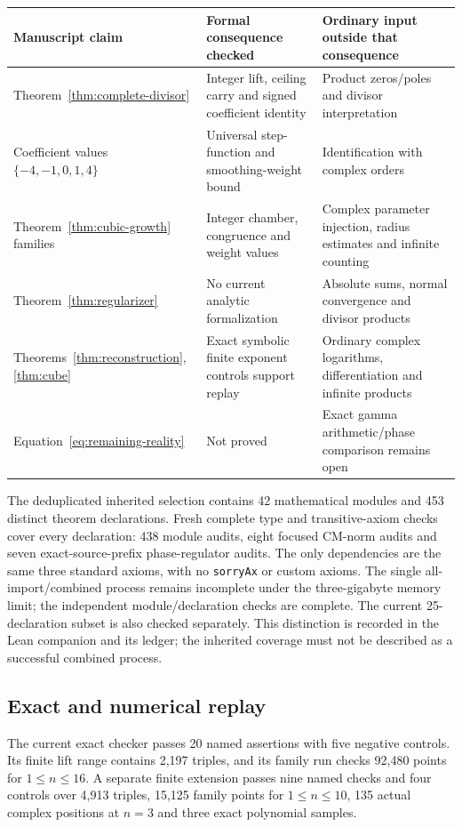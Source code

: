 \begin{longtable}{p{.28\linewidth}p{.29\linewidth}p{.35\linewidth}}
\toprule Manuscript claim & Formal consequence checked & Ordinary input outside that consequence\\\midrule\endhead
Theorem~\ref{thm:complete-divisor} & Integer lift, ceiling carry and signed coefficient identity & Product zeros/poles and divisor interpretation\\
Coefficient values $\{-4,-1,0,1,4\}$ & Universal step-function and smoothing-weight bound & Identification with complex orders\\
Theorem~\ref{thm:cubic-growth} families & Integer chamber, congruence and weight values & Complex parameter injection, radius estimates and infinite counting\\
Theorem~\ref{thm:regularizer} & No current analytic formalization & Absolute sums, normal convergence and divisor products\\
Theorems~\ref{thm:reconstruction}, \ref{thm:cube} & Exact symbolic finite exponent controls support replay & Ordinary complex logarithms, differentiation and infinite products\\
Equation~\eqref{eq:remaining-reality} & Not proved & Exact gamma arithmetic/phase comparison remains open\\\bottomrule
\end{longtable}
The deduplicated inherited selection contains 42 mathematical modules and 453 distinct theorem declarations. Fresh complete type and transitive-axiom checks cover every declaration: 438 module audits, eight focused CM-norm audits and seven exact-source-prefix phase-regulator audits. The only dependencies are the same three standard axioms, with no \texttt{sorryAx} or custom axioms. The single all-import/combined process remains incomplete under the three-gigabyte memory limit; the independent module/declaration checks are complete. The current 25-declaration subset is also checked separately. This distinction is recorded in the Lean companion and its ledger; the inherited coverage must not be described as a successful combined process.

\subsection{Exact and numerical replay}
The current exact checker passes 20 named assertions with five negative controls. Its finite lift range contains 2,197 triples, and its family run checks 92,480 points for $1\le n\le16$. A separate finite extension passes nine named checks and four controls over 4,913 triples, 15,125 family points for $1\le n\le10$, 135 actual complex positions at $n=3$ and three exact polynomial samples.

